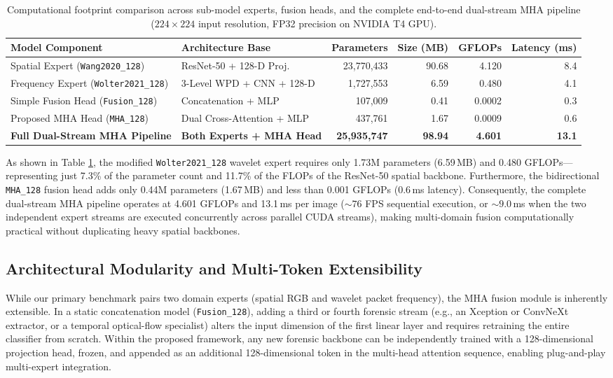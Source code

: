 \documentclass[fleqn,10pt]{wlscirep}
\begin{document}
\begin{table}[htbp]
\centering
\begin{tabular}{|l|l|r|r|r|r|}
\hline
\textbf{Model Component} & \textbf{Architecture Base} & \textbf{Parameters} & \textbf{Size (MB)} & \textbf{GFLOPs} & \textbf{Latency (ms)} \\ \hline
Spatial Expert (\texttt{Wang2020\_128}) & ResNet-50 + 128-D Proj. & 23,770,433 & 90.68 & 4.120 & 8.4 \\
Frequency Expert (\texttt{Wolter2021\_128}) & 3-Level WPD + CNN + 128-D & 1,727,553 & 6.59 & 0.480 & 4.1 \\
Simple Fusion Head (\texttt{Fusion\_128}) & Concatenation + MLP & 107,009 & 0.41 & 0.0002 & 0.3 \\
Proposed MHA Head (\texttt{MHA\_128}) & Dual Cross-Attention + MLP & 437,761 & 1.67 & 0.0009 & 0.6 \\ \hline
\textbf{Full Dual-Stream MHA Pipeline} & \textbf{Both Experts + MHA Head} & \textbf{25,935,747} & \textbf{98.94} & \textbf{4.601} & \textbf{13.1} \\ \hline
\end{tabular}
\caption{\label{tab:parameter_counts}Computational footprint comparison across sub-model experts, fusion heads, and the complete end-to-end dual-stream MHA pipeline ($224 \times 224$ input resolution, FP32 precision on NVIDIA T4 GPU).}
\end{table}

As shown in Table \ref{tab:parameter_counts}, the modified \texttt{Wolter2021\_128} wavelet expert requires only 1.73M parameters (6.59\,MB) and 0.480 GFLOPs---representing just 7.3\% of the parameter count and 11.7\% of the FLOPs of the ResNet-50 spatial backbone. Furthermore, the bidirectional \texttt{MHA\_128} fusion head adds only 0.44M parameters (1.67\,MB) and less than 0.001 GFLOPs (0.6\,ms latency). Consequently, the complete dual-stream MHA pipeline operates at 4.601 GFLOPs and 13.1\,ms per image ($\sim 76$ FPS sequential execution, or $\sim 9.0$\,ms when the two independent expert streams are executed concurrently across parallel CUDA streams), making multi-domain fusion computationally practical without duplicating heavy spatial backbones.

\subsection*{Architectural Modularity and Multi-Token Extensibility}
While our primary benchmark pairs two domain experts (spatial RGB and wavelet packet frequency), the MHA fusion module is inherently extensible. In a static concatenation model (\texttt{Fusion\_128}), adding a third or fourth forensic stream (e.g., an Xception or ConvNeXt extractor, or a temporal optical-flow specialist) alters the input dimension of the first linear layer and requires retraining the entire classifier from scratch. Within the proposed framework, any new forensic backbone can be independently trained with a 128-dimensional projection head, frozen, and appended as an additional 128-dimensional token in the multi-head attention sequence, enabling plug-and-play multi-expert integration.
\end{document}
